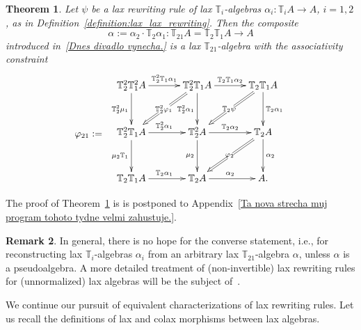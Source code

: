 \documentclass[12pt,leqno]{amsart}
\newtheorem{theorem}{Theorem}%
\theoremstyle{definition}
\newtheorem{remark}[theorem]{Remark}
\def\T{\mathbb{T}}
\def\ttt#1#2{%
  \ifnum#1=0
    \ifnum#2=0
    \else
      \ifnum#2=1
        {\mathbb T}_1%
      \else
        {\mathbb T}_1^{#2}%
      \fi
    \fi
  \else
    \ifnum#2=0
      \ifnum#1=1
        {\mathbb T}_2%
      \else
        {\mathbb T}_2^{#1}%
      \fi
    \else
      \ifnum#1=1
        {\mathbb T}_2%
      \else
        {\mathbb T}_2^{#1}%
      \fi
      \ifnum#2=1
        {\mathbb T}_1%
      \else
        {\mathbb T}_1^{#2}%
      \fi
    \fi
  \fi
}
\newcommand{\4}{\texttt{4}}
\renewcommand{\phi}{\varphi}
\begin{document}
\begin{theorem}
\label{Ozivil jsem Jarcino auto.}
Let $\psi$ be a lax rewriting rule of lax $\T_i$-algebras $\alpha_i : \T_i A \to A$, $i=1,2$, as in Definition~\ref{definition:lax_lax_rewriting}.
Then the composite
\[
\alpha := \alpha_2 \cdot \T_2\alpha_1  : \T_{21} A = \T_2 \T_1 A
\longrightarrow A
\]
introduced in~\eqref{Dnes divadlo vynecha.} is a lax $\T_{21}$-algebra with 
the associativity constraint
\begin{equation}
    \label{Martin prijel do Brna}
\raisebox{-5em}{$\phi_{21} :=$ \ } 
\xymatrix@R=3.2em@C=3.2em{
{\ttt 22}A  \ar[r]^{{\ttt21}\alpha_1}  
\ar[d]_{{\ttt20}\mu_1}
  & \ar[d]_{{\ttt20}\alpha_1}  
\ar@{=>}[ld]|{{\ttt20} \phi_1\rule{.1em}{0pt}}
 \ar[r]^{{\ttt11}\alpha_2} {\ttt21}A &{\ttt 11}A
 \ar[d]^{{\ttt10}\alpha_1}
 \ar@{=>}[ld]|{{\ttt10} \psi \rule{.2em}{0pt}}
\\
\ar[d]_{\mu_2 {\ttt01}} \ar[r]^{{\ttt20} \alpha_1}
{\ttt 21}A & \ar[r]^{{\ttt 10} \alpha_2}  {\ttt 20}A
\ar[d]_{\mu_2} & {\ttt10}A \ar[d]^{\alpha_2} 
\ar@{=>}[ld] |{\phi_2\rule{.1em}{0pt}}
\\ 
{\ttt 11}A \ar[r]^{{\ttt10}\alpha_1}&  {\ttt10}A  \ar[r]^{\alpha_2}  &A.
}
\end{equation}
\end{theorem}

The proof of Theorem~\ref{Ozivil jsem Jarcino auto.} is is postponed
to Appendix~\ref{Ta nova strecha muj program tohoto tydne velmi zahustuje.}. 

\begin{remark}
In general, there is no hope for the converse statement, i.e., for
reconstructing lax $\T_i$-algebras $\alpha_i$ from an arbitrary lax
$\T_{21}$-algebra $\alpha$, unless $\alpha$ is a pseudoalgebra. A more
detailed treatment of (non-invertible) lax rewriting rules for
(unnormalized) lax algebras will be the subject
of~\cite{Stepan-Trnka}.
\end{remark}
We continue our pursuit of equivalent characterizations of lax
rewriting rules.
Let us recall the definitions of lax and colax morphisms between lax algebras.
\end{document}
